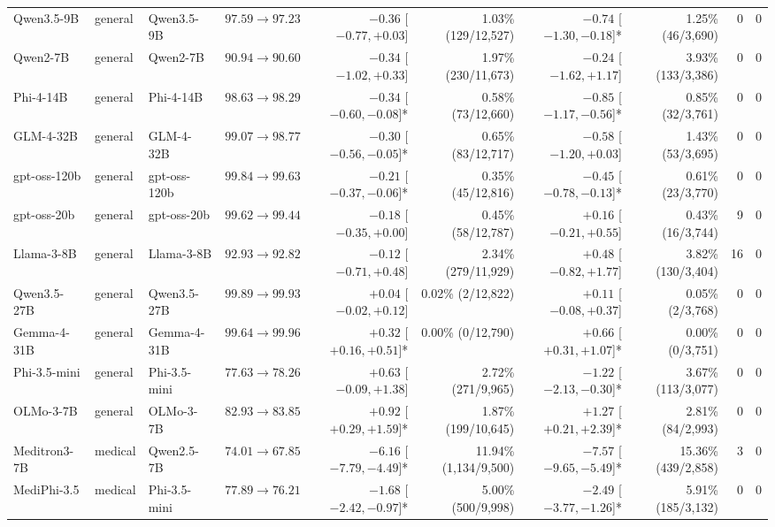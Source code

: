 \documentclass[11pt]{article}
\begin{document}
\begin{table}[t]
\begin{tabular}{@{}lllrrrrrrr@{}}
Qwen3.5-9B & general & Qwen3.5-9B & $97.59 \to 97.23$ & $-0.36$ [$-0.77, +0.03$]\phantom{*} & 1.03\% (129/12,527) & $-0.74$ [$-1.30, -0.18$]* & 1.25\% (46/3,690) & 0 & 0 \\
Qwen2-7B & general & Qwen2-7B & $90.94 \to 90.60$ & $-0.34$ [$-1.02, +0.33$]\phantom{*} & 1.97\% (230/11,673) & $-0.24$ [$-1.62, +1.17$]\phantom{*} & 3.93\% (133/3,386) & 0 & 0 \\
Phi-4-14B & general & Phi-4-14B & $98.63 \to 98.29$ & $-0.34$ [$-0.60, -0.08$]* & 0.58\% (73/12,660) & $-0.85$ [$-1.17, -0.56$]* & 0.85\% (32/3,761) & 0 & 0 \\
GLM-4-32B & general & GLM-4-32B & $99.07 \to 98.77$ & $-0.30$ [$-0.56, -0.05$]* & 0.65\% (83/12,717) & $-0.58$ [$-1.20, +0.03$]\phantom{*} & 1.43\% (53/3,695) & 0 & 0 \\
gpt-oss-120b & general & gpt-oss-120b & $99.84 \to 99.63$ & $-0.21$ [$-0.37, -0.06$]* & 0.35\% (45/12,816) & $-0.45$ [$-0.78, -0.13$]* & 0.61\% (23/3,770) & 0 & 0 \\
gpt-oss-20b & general & gpt-oss-20b & $99.62 \to 99.44$ & $-0.18$ [$-0.35, +0.00$]\phantom{*} & 0.45\% (58/12,787) & $+0.16$ [$-0.21, +0.55$]\phantom{*} & 0.43\% (16/3,744) & 9 & 0 \\
Llama-3-8B & general & Llama-3-8B & $92.93 \to 92.82$ & $-0.12$ [$-0.71, +0.48$]\phantom{*} & 2.34\% (279/11,929) & $+0.48$ [$-0.82, +1.77$]\phantom{*} & 3.82\% (130/3,404) & 16 & 0 \\
Qwen3.5-27B & general & Qwen3.5-27B & $99.89 \to 99.93$ & $+0.04$ [$-0.02, +0.12$]\phantom{*} & 0.02\% (2/12,822) & $+0.11$ [$-0.08, +0.37$]\phantom{*} & 0.05\% (2/3,768) & 0 & 0 \\
Gemma-4-31B & general & Gemma-4-31B & $99.64 \to 99.96$ & $+0.32$ [$+0.16, +0.51$]* & 0.00\% (0/12,790) & $+0.66$ [$+0.31, +1.07$]* & 0.00\% (0/3,751) & 0 & 0 \\
Phi-3.5-mini & general & Phi-3.5-mini & $77.63 \to 78.26$ & $+0.63$ [$-0.09, +1.38$]\phantom{*} & 2.72\% (271/9,965) & $-1.22$ [$-2.13, -0.30$]* & 3.67\% (113/3,077) & 0 & 0 \\
OLMo-3-7B & general & OLMo-3-7B & $82.93 \to 83.85$ & $+0.92$ [$+0.29, +1.59$]* & 1.87\% (199/10,645) & $+1.27$ [$+0.21, +2.39$]* & 2.81\% (84/2,993) & 0 & 0 \\
\midrule
Meditron3-7B & medical & Qwen2.5-7B & $74.01 \to 67.85$ & $-6.16$ [$-7.79, -4.49$]* & 11.94\% (1,134/9,500) & $-7.57$ [$-9.65, -5.49$]* & 15.36\% (439/2,858) & 3 & 0 \\
MediPhi-3.5 & medical & Phi-3.5-mini & $77.89 \to 76.21$ & $-1.68$ [$-2.42, -0.97$]* & 5.00\% (500/9,998) & $-2.49$ [$-3.77, -1.26$]* & 5.91\% (185/3,132) & 0 & 0 \\

\end{tabular}
\end{table}
\end{document}

